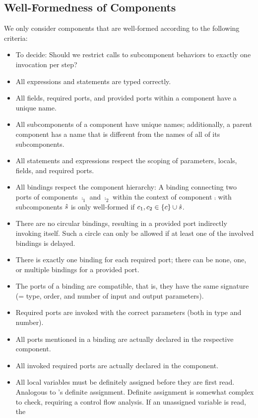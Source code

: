 \documentclass[a4paper,10pt,english]{article}
\begin{document}
\subsection{Well-Formedness of Components}
We only consider components that are well-formed according to the following criteria:
\begin{itemize}
	\item To decide: Should we restrict calls to subcomponent behaviors to exactly one invocation per step?
	\item All expressions and statements are typed correctly.
	\item All fields, required ports, and provided ports within a component have a unique name.
	\item All subcomponents of a component have unique names; additionally, a parent component has a name that is different from the
	names of all of its subcomponents.
	\item All statements and expressions respect the scoping of parameters, locals, fields, and required ports.
	\item All bindings respect the component hierarchy: A binding connecting two ports of components $\comp_1$ and $\comp_2$ within
	the context of component $\comp$ with subcomponents $\hat{s}$ is only well-formed if $c_1, c_2 \in \{ c \} \cup
	\hat{s}$.
	\item There are no circular bindings, resulting in a provided port indirectly invoking itself. Such a circle can only be allowed
	if at least one of the involved bindings is delayed.
	\item There is exactly one binding for each required port; there can be none, one, or multiple bindings for a provided port.
	\item The ports of a binding are compatible, that is, they have the same signature (= type, order, and number of input and
	output parameters).
	\item Required ports are invoked with the correct parameters (both in type and number).
	\item All ports mentioned in a binding are actually declared in the respective component.
	\item All invoked required ports are actually declared in the component.
	\item All local variables must be definitely assigned before they are first read. Analogous to \CSharp's definite assignment.
	Definite assignment is somewhat complex to check, requiring a control flow analysis. If an unassigned variable is read, the

\end{itemize}
\end{document}
